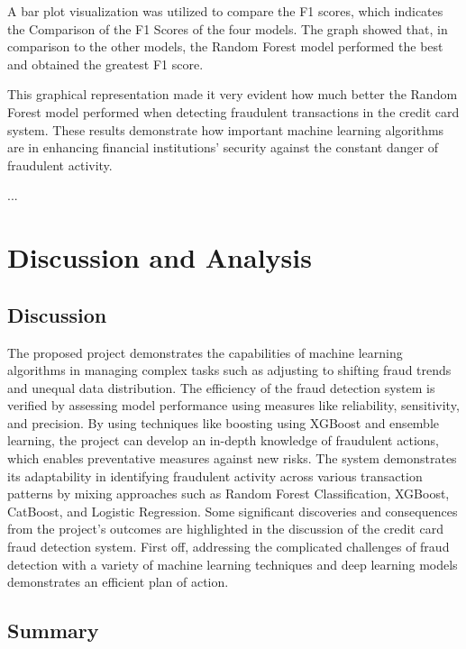 A bar plot visualization was utilized to compare the F1 scores, which indicates the Comparison of the F1 Scores of the four models. The graph showed that, in comparison to the other models, the Random Forest model performed the best and obtained the greatest F1 score.

This graphical representation made it very evident how much better the Random Forest model performed when detecting fraudulent transactions in the credit card system. These results demonstrate how important machine learning algorithms are in enhancing financial institutions' security against the constant danger of fraudulent activity. 


...





\section{Discussion and Analysis}

\subsection{Discussion}
The proposed project demonstrates the capabilities of machine learning algorithms in managing complex tasks such as adjusting to shifting fraud trends and unequal data distribution. The efficiency of the fraud detection system is verified by assessing model performance using measures like reliability, sensitivity, and precision. By using techniques like boosting using XGBoost and ensemble learning, the project can develop an in-depth knowledge of fraudulent actions, which enables preventative measures against new risks. 
The system demonstrates its adaptability in identifying fraudulent activity across various transaction patterns by mixing approaches such as Random Forest Classification, XGBoost, CatBoost, and Logistic Regression. Some significant discoveries and consequences from the project's outcomes are highlighted in the discussion of the credit card fraud detection system. First off, addressing the complicated challenges of fraud detection with a variety of machine learning techniques and deep learning models demonstrates an efficient plan of action.

\subsection{Summary}


